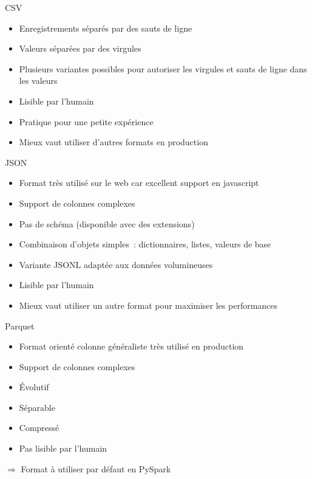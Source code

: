 \begin{frame}{CSV}
  \begin{itemize}
    \item Enregistrements séparés par des sauts de ligne
    \item Valeurs séparées par des virgules
    \item Plusieurs variantes possibles pour autoriser les virgules et sauts de ligne dans les valeurs
    \item Lisible par l'humain
    \item Pratique pour une petite expérience
    \item Mieux vaut utiliser d'autres formats en production
  \end{itemize}
\end{frame}

\begin{frame}{JSON}
  \begin{itemize}
    \item Format très utilisé sur le web car excellent support en javascript
    \item Support de colonnes complexes
    \item Pas de schéma (disponible avec des extensions)
    \item Combinaison d'objets simples~: dictionnaires, listes, valeurs de base
    \item Variante JSONL adaptée aux données volumineuses
    \item Lisible par l'humain
    \item Mieux vaut utiliser un autre format pour maximiser les performances
  \end{itemize}
\end{frame}

\begin{frame}{Parquet}
  \begin{itemize}
    \item Format orienté colonne généraliste très utilisé en production
    \item Support de colonnes complexes
    \item Évolutif
    \item Séparable
    \item Compressé
    \item Pas lisible par l'humain
  \end{itemize}

  $\Rightarrow$ Format à utiliser par défaut en PySpark
\end{frame}

